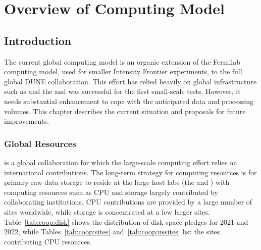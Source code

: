 \documentclass[../main-v1.tex]{subfiles}
\begin{document}
\chapter{Overview of Computing Model }
\label{ch:cm}

\section{Introduction }\label{ch:cm:intro} %






The current  global computing model is an organic extension of the Fermilab  computing model, used for smaller Intensity Frontier experiments, to the full global DUNE collaboration.  This effort  has relied heavily on global infrastructure such as  and the  and was successful for the first small-scale  tests. However, it needs substantial enhancement to cope with the anticipated data and processing volumes.  This chapter describes the current situation and proposals for future improvements. 

\subsection{Global Resources}

 is a global collaboration %
for which the large-scale computing effort relies on %
international contributions. The long-term strategy for computing resources is for primary raw data storage to reside at the large host labs (the  and ) with computing resources such as %
CPU and storage largely contributed by collaborating %
institutions. CPU contributions are provided by a large number of sites worldwide, while storage is concentrated at a few larger %
sites. Table~\ref{tab:coop:disk} shows the distribution of disk space pledges for 2021 and 2022, while Tables~\ref{tab:coop:sites} and~\ref{tab:coop:ussites} list the sites contributing CPU resources. 
\end{document}
